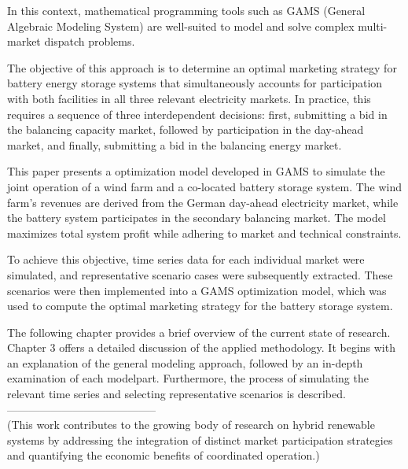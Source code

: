 In this context, mathematical programming tools such as GAMS (General Algebraic Modeling System)
are well-suited to model and solve complex multi-market dispatch problems.

The objective of this approach is to determine an optimal marketing strategy for battery energy storage
systems that simultaneously accounts for participation with both facilities in all three relevant electricity
markets.
In practice, this requires a sequence of three interdependent decisions: first, submitting a bid in
the balancing capacity market, followed by participation in the day-ahead market, and finally,
submitting a bid in the balancing energy market.

This paper presents a optimization model developed in GAMS to simulate the joint operation of a
wind farm and a co-located battery storage system. The wind farm's revenues are derived from the German day-ahead
electricity market, while the battery system participates in the secondary balancing market.
The model maximizes total system profit while adhering to market and technical constraints.

To achieve this objective, time series data for each individual market were simulated,
and representative scenario cases were subsequently extracted. These scenarios were then
implemented into a GAMS optimization model, which was used to compute the optimal marketing
strategy for the battery storage system.

The following chapter provides a brief overview of the current state of research. Chapter 3 offers a detailed
discussion of the applied methodology. It begins with an explanation of the general modeling approach,
followed by an in-depth examination of each modelpart. Furthermore, the process of simulating the relevant
time series and selecting representative scenarios is described.
-----------------------------------------\\


(This work contributes to the growing body of research on hybrid renewable systems by addressing the
integration of distinct market participation strategies and quantifying the economic benefits of coordinated operation.)

